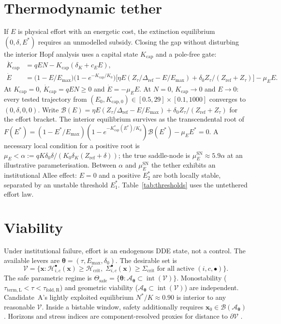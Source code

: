 \documentclass[11pt]{article}
\theoremstyle{definition}
\begin{document}
\section{Thermodynamic tether}
\label{app:tether}

If $E$ is physical effort with an energetic cost, the extinction equilibrium $(0,\delta,E^*)$ requires an unmodelled subsidy. Closing the gap without disturbing the interior Hopf analysis uses a capital state $K_{\mathrm{cap}}$ and a pole-free gate:
\begin{align}
\dot K_{\mathrm{cap}} &= qEN-K_{\mathrm{cap}}(\delta_K+c_E E),\\
\dot E &= \bigl(1-E/E_{\max}\bigr)\bigl(1-e^{-K_{\mathrm{cap}}/K_0}\bigr)
\bigl[\eta E(Z_\tau/\Delta_{\mathrm{ref}}-E/E_{\max})+\delta_0 Z_\tau/(Z_{\mathrm{ref}}+Z_\tau)\bigr]-\mu_E E.
\end{align}
At $K_{\mathrm{cap}}=0$, $\dot K_{\mathrm{cap}}=qEN\ge 0$ and $\dot E=-\mu_E E$. At $N=0$, $K_{\mathrm{cap}}\to 0$ and $E\to 0$: every tested trajectory from $(E_0,K_{\mathrm{cap},0})\in[0.5,29]\times[0.1,1000]$ converges to $(0,\delta,0,0)$. Write $\mathcal B(E)=\eta E(Z_\tau/\Delta_{\mathrm{ref}}-E/E_{\max})+\delta_0 Z_\tau/(Z_{\mathrm{ref}}+Z_\tau)$ for the effort bracket. The interior equilibrium survives as the transcendental root of $F(E^*)=(1-E^*/E_{\max})(1-e^{-K_{\mathrm{cap}}^*(E^*)/K_0})\mathcal B(E^*)-\mu_E E^*=0$. A necessary local condition for a positive root is $\mu_E<\alpha:=qK\delta_0\delta/(K_0\delta_K(Z_{\mathrm{ref}}+\delta))$; the true saddle-node is $\mu_E^{\mathrm{SN}}\approx 5.9\alpha$ at an illustrative parameterisation. Between $\alpha$ and $\mu_E^{\mathrm{SN}}$ the tether exhibits an institutional Allee effect: $E=0$ and a positive $E_2^*$ are both locally stable, separated by an unstable threshold $E_1^*$. Table~\ref{tab:thresholds} uses the untethered effort law.

\section{Viability}
\label{app:viability}

Under institutional failure, effort is an endogenous DDE state, not a control. The available levers are $\boldsymbol\theta=(\tau,E_{\max},\delta_0)$. The desirable set is
\[
\mathcal V=\bigl\{\mathbf x:\mathcal H^\bullet_{i,c}(\mathbf x)\ge\mathcal H_{\mathrm{crit}},\;
\Sigma^\bullet_{i,c}(\mathbf x)\ge\Sigma_{\mathrm{crit}}
\text{ for all active }(i,c,\bullet)\bigr\}.
\]
The safe parametric regime is $\Theta_{\mathrm{safe}}=\{\boldsymbol\theta:\mathcal A_{\boldsymbol\theta}\subset\operatorname{int}(\mathcal V)\}$. Monostability ($\tau_{\mathrm{term,L}}<\tau<\tau_{\mathrm{fold,R}}$) and geometric viability ($\mathcal A_{\boldsymbol\theta}\subset\operatorname{int}(\mathcal V)$) are independent. Candidate~A's lightly exploited equilibrium $N^*/K\approx 0.90$ is interior to any reasonable $\mathcal V$. Inside a bistable window, safety additionally requires $\mathbf x_0\in\mathcal B(\mathcal A_{\boldsymbol\theta})$. Horizons and stress indices are component-resolved proxies for distance to $\partial\mathcal V$ \cite{aubin1991,cury2005}.
\end{document}
